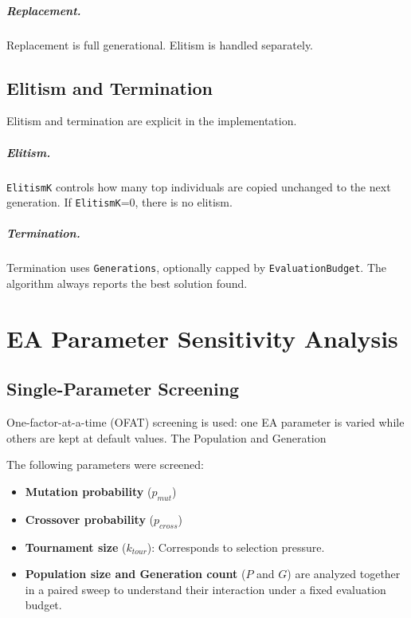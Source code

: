 \documentclass[12pt,a4paper]{report}
\begin{document}
\paragraph{Replacement.}
Replacement is full generational. Elitism is handled separately.

\section{Elitism and Termination}
Elitism and termination are explicit in the implementation.

\paragraph{Elitism.}
\texttt{ElitismK} controls how many top individuals are copied unchanged to the next generation. If \texttt{ElitismK}=0, there is no elitism.

\paragraph{Termination.}
Termination uses \texttt{Generations}, optionally capped by \texttt{EvaluationBudget}. The algorithm always reports the best solution found.

\chapter{EA Parameter Sensitivity Analysis}
\section{Single-Parameter Screening}
One-factor-at-a-time (OFAT) screening is used: one EA parameter is varied while others are kept at default values. The Population and Generation

The following parameters were screened:
\begin{itemize}
    \item \textbf{Mutation probability} ($p_{mut}$)
    \item \textbf{Crossover probability} ($p_{cross}$)
    \item \textbf{Tournament size} ($k_{tour}$): Corresponds to selection pressure.
    \item \textbf{Population size and Generation count} ($P$ and $G$) are analyzed together in a paired sweep to understand their interaction under a fixed evaluation budget.
\end{itemize}
\end{document}
